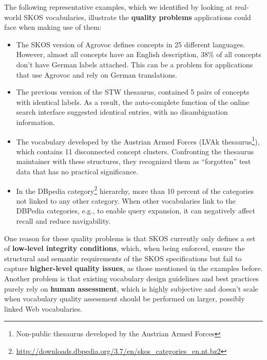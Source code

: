 \documentclass{llncs}
\begin{document}
The following representative examples, which we identified by looking at real-world SKOS vocabularies, illustrate the \textbf{quality problems} applications could face when making use of them:
\begin{itemize}
	\item The SKOS version of Agrovoc defines concepts in 25 different languages. However, almost all concepts have an English description, 38\% of all concepts don’t have German labels attached. This can be a problem for applications that use Agrovoc and rely on German translations.

	\item The previous version of the STW thesaurus, contained 5 pairs of concepts with identical labels. As a result, the auto-complete function of the online search interface suggested identical entries, with no disambiguation information.

	\item The vocabulary developed by the Austrian Armed Forces (LVAk thesaurus\footnote{Non-public thesaurus developed by the Austrian Armed Forces}), which contains 11 disconnected concept clusters. Confronting the thesaurus maintainer with these structures, they recognized them as “forgotten” test data that has no practical significance.

	\item In the DBpedia category\footnote{\url{http://downloads.dbpedia.org/3.7/en/skos_categories_en.nt.bz2}} hierarchy, more than 10 percent of the categories not linked to any other category. When other vocabularies link to the DBPedia categories, e.g., to enable query expansion, it can negatively affect recall and reduce navigability.
\end{itemize}

One reason for these quality problems is that SKOS currently only defines a set of \textbf{low-level integrity conditions}, which, when being enforced, ensure the structural and semantic requirements of the SKOS specifications but fail to capture \textbf{higher-level quality issues}, as those mentioned in the examples before. Another problem is that existing vocabulary design guidelines and best practices purely rely on \textbf{human assessment}, which is highly subjective and doesn’t scale when vocabulary quality assessment should be performed on larger, possibly linked Web vocabularies.
\end{document}
